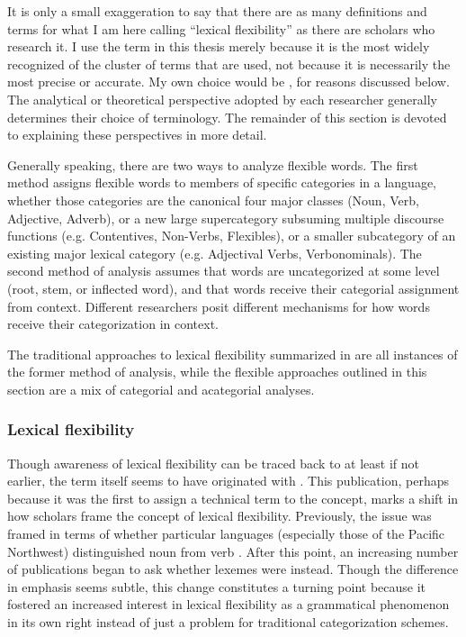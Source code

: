 It is only a small exaggeration to say that there are as many definitions and terms for what I am here calling \enquote{lexical flexibility} as there are scholars who research it. I use the term  in this thesis merely because it is the most widely recognized of the cluster of terms that are used, not because it is necessarily the most precise or accurate. My own choice would be , for reasons discussed below. The analytical or theoretical perspective adopted by each researcher generally determines their choice of terminology. The remainder of this section is devoted to explaining these perspectives in more detail.

Generally speaking, there are two ways to analyze flexible words. The first method assigns flexible words to members of specific categories in a language, whether those categories are the canonical four major classes (Noun, Verb, Adjective, Adverb), or a new large supercategory subsuming multiple discourse functions (e.g. Contentives, Non-Verbs, Flexibles), or a smaller subcategory of an existing major lexical category (e.g. Adjectival Verbs, Verbonominals). The second method of analysis assumes that words are uncategorized at some level (root, stem, or inflected word), and that words receive their categorial assignment from context. Different researchers posit different mechanisms for how words receive their categorization in context.

The traditional approaches to lexical flexibility summarized in  are all instances of the former method of analysis, while the flexible approaches outlined in this section are a mix of categorial and acategorial analyses.

\subsubsection{Lexical flexibility}
\label{sec:2.3.1.1}

Though awareness of lexical flexibility can be traced back to at least \textcite[174--177]{Gallatin1836} if not earlier, the term  itself seems to have originated with \textcite[Ch.~4]{Hengeveld1992}. This publication, perhaps because it was the first to assign a technical term to the concept, marks a shift in how scholars frame the concept of lexical flexibility. Previously, the issue was framed in terms of whether particular languages (especially those of the Pacific Northwest) distinguished noun from verb \parencites{Kuipers1968}{Jacobsen1979}{Hebert1983}{Kinkade1983}{EijkHess1986}{JelinekDemers1994}. After this point, an increasing number of publications began to ask whether lexemes were  instead. Though the difference in emphasis seems subtle, this change constitutes a turning point because it fostered an increased interest in lexical flexibility as a grammatical phenomenon in its own right instead of just a problem for traditional categorization schemes.

